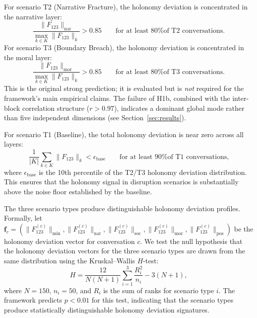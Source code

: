 \begin{hypothesis}
\label{hyp:block-specificity}
For scenario T2 (Narrative Fracture), the holonomy deviation is concentrated in the
narrative layer:
\[
    \frac{\|F_{123}\|_{\mathrm{nar}}}{\max_{k \in K} \|F_{123}\|_k} > 0.85
    \qquad \text{for at least 80\% of T2 conversations.}
\]
For scenario T3 (Boundary Breach), the holonomy deviation is concentrated in the moral
layer:
\[
    \frac{\|F_{123}\|_{\mathrm{mor}}}{\max_{k \in K} \|F_{123}\|_k} > 0.85
    \qquad \text{for at least 80\% of T3 conversations.}
\]
This is the original strong prediction; it is evaluated but is \emph{not} required for the
framework's main empirical claims. The failure of H1b, combined with the inter-block
correlation structure ($r > 0.97$), indicates a dominant global mode rather than five
independent dimensions (see Section~\ref{sec:results}).
\end{hypothesis}

\begin{hypothesis}
\label{hyp:baseline-zero}
For scenario T1 (Baseline), the total holonomy deviation is near zero across all layers:
\[
    \frac{1}{|K|} \sum_{k \in K} \|F_{123}\|_k < \epsilon_{\mathrm{base}}
    \qquad \text{for at least 90\% of T1 conversations,}
\]
where $\epsilon_{\mathrm{base}}$ is the 10th percentile of the T2/T3 holonomy deviation
distribution. This ensures that the holonomy signal in disruption scenarios is
substantially above the noise floor established by the baseline.
\end{hypothesis}

\begin{hypothesis}
\label{hyp:kruskal-wallis}
The three scenario types produce distinguishable holonomy deviation profiles. Formally, let
$\mathbf{f}_c = (\|F_{123}^{(c)}\|_{\mathrm{min}}, \|F_{123}^{(c)}\|_{\mathrm{nar}},
\|F_{123}^{(c)}\|_{\mathrm{soc}}, \|F_{123}^{(c)}\|_{\mathrm{mor}},
\|F_{123}^{(c)}\|_{\mathrm{pos}})$ be the holonomy deviation vector for conversation $c$. We test
the null hypothesis that the holonomy deviation vectors for the three scenario types are drawn from
the same distribution using the Kruskal--Wallis $H$-test:
\[
    H = \frac{12}{N(N+1)} \sum_{i=1}^{3} \frac{R_i^2}{n_i} - 3(N+1),
\]
where $N = 150$, $n_i = 50$, and $R_i$ is the sum of ranks for scenario type $i$. The
framework predicts $p < 0.01$ for this test, indicating that the scenario types produce
statistically distinguishable holonomy deviation signatures.
\end{hypothesis}

